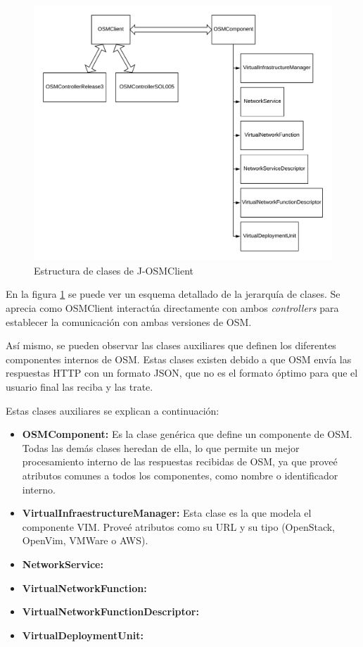 \clearpage

\begin{figure}[!ht]
	\centering
	\includegraphics[width=0.9\linewidth]{imagenes/OSMClient}
	\caption{Estructura de clases de J-OSMClient}
	\label{fig:osmclient}
\end{figure}

En la figura \ref{fig:osmclient} se puede ver un esquema detallado de la jerarquía de clases. Se aprecia como OSMClient interactúa directamente con ambos \textit{controllers} para establecer la comunicación con ambas versiones de OSM.

Así mismo, se pueden observar las clases auxiliares que definen los diferentes componentes internos de OSM. Estas clases existen debido a que OSM envía las respuestas HTTP con un formato JSON, que no es el formato óptimo para que el usuario final las reciba y las trate.

Estas clases auxiliares se explican a continuación:

\begin{itemize}
	\item \textbf{OSMComponent:} Es la clase genérica que define un componente de OSM. Todas las demás clases heredan de ella, lo que permite un mejor procesamiento interno de las respuestas recibidas de OSM, ya que proveé atributos comunes a todos los componentes, como nombre o identificador interno.
	
	\item \textbf{VirtualInfraestructureManager:} Esta clase es la que modela el componente VIM. Proveé atributos como su URL y su tipo (OpenStack, OpenVim, VMWare o AWS).
	
	\item \textbf{NetworkService:} 
	
	\item \textbf{VirtualNetworkFunction:} 
	
	\item \textbf{VirtualNetworkFunctionDescriptor:} 
	
	\item \textbf{VirtualDeploymentUnit:} 
	
\end{itemize}




